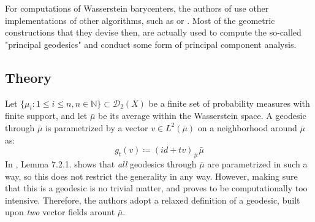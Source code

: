 \documentclass{article}
\begin{document}
For computations of Wasserstein barycenters, the authors of \cite{seguycuturi2015}
use other implementations of other algorithms, such as \cite{benamou2015} or 
\cite{cuturi2014}. Most of the geometric constructions that they devise then,
are actually used to compute the so-called "principal geodesics" and conduct 
some form of principal component analysis.

\subsection{Theory}
Let $\{\mu_i : 1\leq i\leq n, n\in \mathbb{N}\}\subset \mathscr{D}_2(X)$
be a finite set of probability measures with finite support, and let $\bar{\mu}$
be its average within the Wasserstein space. A geodesic through $\bar\mu$ is
parametrized by a vector $v\in L^2(\bar\mu)$ on a neighborhood around $\bar\mu$
as:
\[g_t(v)\coloneqq (id + tv)_\#\bar\mu \]
In \cite{ambgigli2006}, Lemma 7.2.1. shows that \textit{all} geodesics
through $\bar\mu$ are parametrized in such a way, so this does not restrict
the generality in any way. However, making sure that this is a geodesic is 
no trivial matter, and proves to be computationally too intensive. Therefore,
the authors adopt a relaxed definition of a geodesic, built upon \textit{two}
vector fields arount $\bar\mu$.
\end{document}
